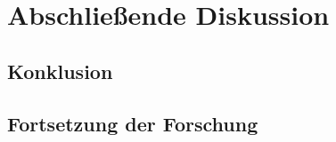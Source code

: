 \chapter{Abschließende Diskussion}
\label{c:abschldiskussion}



\section{Konklusion}
\label{s:konklusion}


\section{Fortsetzung der Forschung}
\label{s:forschung}


















